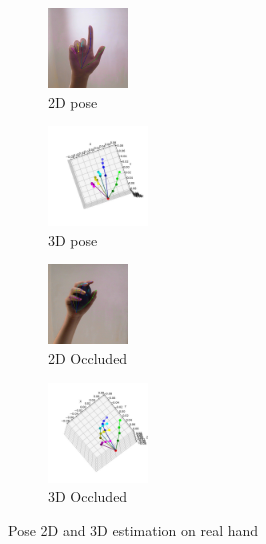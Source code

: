\begin{figure}[ht]
    \begin{center}
        \begin{subfigure}[b]{0.19\textwidth}
            \includegraphics[width=80px]{assets/real_2d.jpg}
            \caption{2D pose}
            \label{fig:real_hand_2d}
        \end{subfigure}
        \begin{subfigure}[b]{0.21\textwidth}
            \includegraphics[width=100px]{assets/real_3d.jpg}
            \caption{3D pose}
            \label{fig:real_hand_3d}
        \end{subfigure}
        \begin{subfigure}[b]{0.19\textwidth}
            \includegraphics[width=80px]{assets/occluded_2d.jpg}
            \caption{2D Occluded}
            \label{fig:occluded_real_hand_2d}
        \end{subfigure}
        \begin{subfigure}[b]{0.21\textwidth}
            \includegraphics[width=100px]{assets/occluded_3d.jpg}
            \caption{3D Occluded}
            \label{fig:occuluded_real_hand_3d}
        \end{subfigure}
	    \caption{Pose 2D and 3D estimation on real hand}
	    \label{fig:pose_2d_and_3d_on_real_hand}        
    \end{center}
\end{figure}


